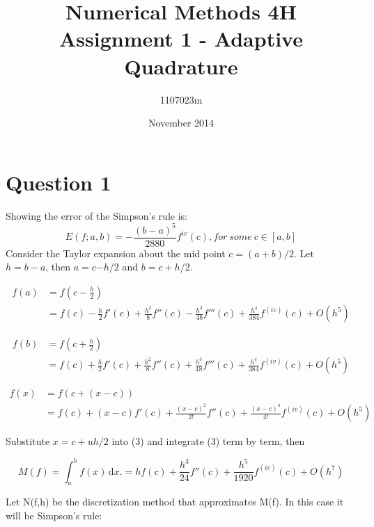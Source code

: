 \documentclass[fleqn]{report}
\begin{document}
\title{Numerical Methods 4H Assignment 1 - Adaptive Quadrature}
\author{1107023m}
\date{November 2014}
\maketitle

\section{Question 1}
Showing the error of the Simpson's rule is:
\begin{equation*}
E(f;a,b) = -\frac{(b-a)^5}{2880}f^{iv}(c), for\ some \ c \in [a,b]
\end{equation*}
Consider the Taylor expansion about the mid point $c = (a+b)/2$. 
Let $h =b-a$, then $a =c$$-h/2$ and $b=c+h/2$.

\begin{equation}
\begin{split}
f(a) & =f(c - \frac{h}{2})\\
& = f(c) - \frac{h}{2}f'(c) + \frac{h^2}{8}f''(c) - \frac{h^3}{48}f'''(c) + \frac{h^4}{384}f^{(iv)}(c) + O(h^5)
\end{split}
\end{equation}

\begin{equation}
\begin{split}
f(b) & =f(c + \frac{h}{2})\\
& = f(c) + \frac{h}{2}f'(c) + \frac{h^2}{8}f''(c) + \frac{h^3}{48}f'''(c) + \frac{h^4}{384}f^{(iv)}(c) + O(h^5)
\end{split}
\end{equation}

\begin{equation}
\begin{split}
f(x) & =f(c + (x - c))\\
& = f(c) + (x - c)f'(c) + \frac{(x-c)^2}{2!}f''(c) + \frac{(x-c)^4}{4!}f^{(iv)}(c) + O(h^5) 
\end{split}
\end{equation}

Substitute $x=c+uh/2$ into (3) and integrate (3) term by term, then

\begin{equation*}
M(f) = \int_a^b \! f(x) \, \mathrm{d}x. 
= hf(c) + \frac{h^3}{24}f''(c) + \frac{h^5}{1920}f^{(iv)}(c) + O(h^7)
\end{equation*}

Let N(f,h) be the discretization method that approximates M(f). In this case it will be Simpson's rule:
\end{document}
